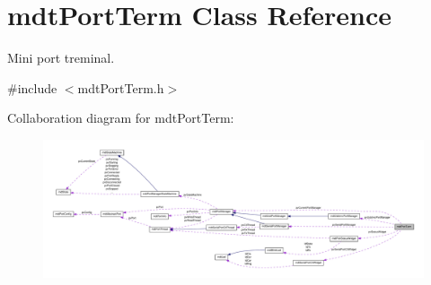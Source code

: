 \hypertarget{classmdt_port_term}{
\section{mdtPortTerm Class Reference}
\label{classmdt_port_term}
}


Mini port treminal.  




{\ttfamily \#include $<$mdtPortTerm.h$>$}



Collaboration diagram for mdtPortTerm:\nopagebreak
\begin{figure}[H]
\begin{center}
\leavevmode
\includegraphics[width=400pt]{classmdt_port_term__coll__graph}
\end{center}
\end{figure}
